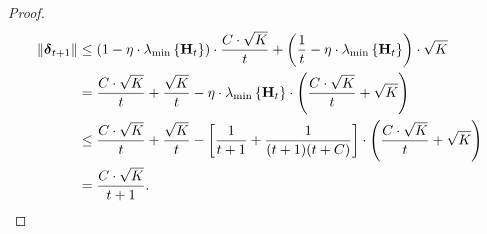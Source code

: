 \documentclass[10pt]{article}
\begin{document}
\begin{proof}
\begin{equation*}
\begin{split}
    \left\| {\boldsymbol{\delta}}_{t+1} \right\| &\le \left( 1 - \eta \cdot \lambda_{\min}\left\{ {\mathbf{H}}_t \right\} \right) \cdot \frac{C \cdot \sqrt{K}}{t} + \left( \frac{1}{t} - \eta \cdot \lambda_{\min}\left\{ {\mathbf{H}}_t \right\} \right) \cdot \sqrt{K} \\
    &= \frac{C \cdot \sqrt{K}}{t} + \frac{\sqrt{K}}{t} - \eta \cdot \lambda_{\min}\left\{ {\mathbf{H}}_t \right\} \cdot \left( \frac{C \cdot \sqrt{K}}{t} + \sqrt{K} \right) \\
    &\le \frac{C \cdot \sqrt{K}}{t} + \frac{\sqrt{K}}{t} - \left[ \frac{1}{t+1} + \frac{1}{(t+1)(t+C)} \right] \cdot \left( \frac{C \cdot \sqrt{K}}{t} + \sqrt{K} \right) \\
    &= \frac{C \cdot \sqrt{K}}{t+1}. \qedhere
\end{split}
\end{equation*}
\end{proof}
\end{document}
